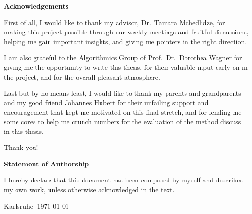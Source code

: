 \thispagestyle{plain}

\centerline{\textbf{Acknowledgements}}
\vspace{0.25cm}

First of all, I would like to thank my advisor, {Dr.~Tamara Mchedlidze}, for making this project possible through our weekly meetings and fruitful discussions, helping me gain important insights, and giving me pointers in the right direction.

I am also grateful to the Algorithmics Group of {Prof.~Dr.~Dorothea Wagner} for giving me the opportunity to write this thesis, for their valuable input early on in the project, and for the overall pleasant atmosphere.

Last but by no means least, I would like to thank my parents and grandparents and my good friend Johannes Hubert for their unfailing support and encouragement that kept me motivated on this final stretch, and for lending me some cores to help me crunch numbers for the evaluation of the method discuss in this thesis.

Thank you!

\vspace*{\fill}



\centerline{\textbf{Statement of Authorship}}
\vspace{0.25cm}

I hereby declare that this document has been composed by myself and describes my own work, unless otherwise acknowledged in the text.

\vspace{2.5cm}

\noindent
\makebox[7.5cm]{\hrulefill}

\hspace{0.25cm}
Karlsruhe, \today

\vspace{2cm}

